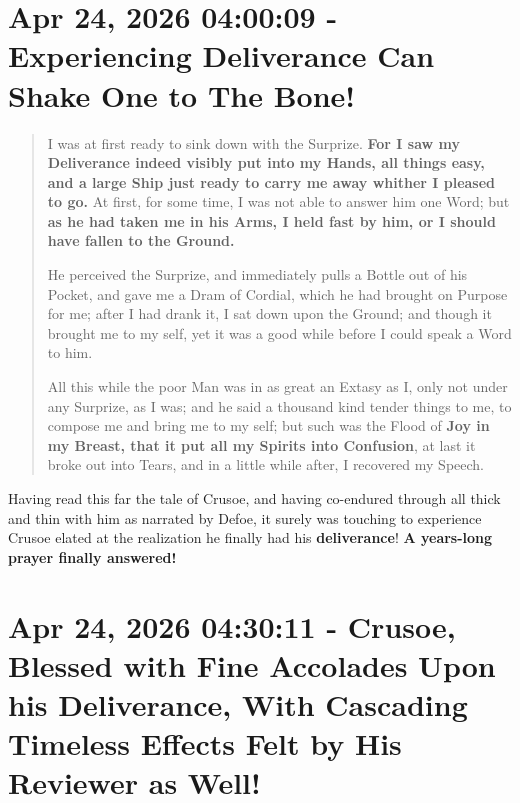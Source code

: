 \documentclass[a4paper]{article}
\begin{document}
\section{Apr 24, 2026 04:00:09 - Experiencing Deliverance Can Shake One to The Bone!}
\label{SEC65}


\noindent
\begin{minipage}{1\textwidth}
\vspace{1em}
\begin{quotation}
{\ttfamily


I was at first ready to sink down with the Surprize. \textbf{For I saw my Deliverance indeed visibly put into my Hands, all things easy, and a large Ship just ready to carry me away whither I pleased to go.} At first, for some time, I was not able to answer him one Word; but \textbf{as he had taken me in his Arms, I held fast by him, or I should have fallen to the Ground.}

He perceived the Surprize, and immediately pulls a Bottle out of his Pocket, and gave me a Dram of Cordial, which he had brought on Purpose for me; after I had drank it, I sat down upon the Ground; and though it brought me to my self, yet it was a good while before I could speak a Word to him.

All this while the poor Man was in as great an Extasy as I, only not under any Surprize, as I was; and he said a thousand kind tender things to me, to compose me and bring me to my self; but such was the Flood of \textbf{Joy in my Breast, that it put all my Spirits into Confusion}, at last it broke out into Tears, and in a little while after, I recovered my Speech.


}
\end{quotation}
\vspace{1em}
\end{minipage}




Having read this far the tale of Crusoe, and having co-endured through all thick and thin with him as narrated by Defoe, it surely was touching to experience Crusoe elated at the realization he finally had his \textbf{deliverance}! \textbf{A years-long prayer finally answered!}





\section{Apr 24, 2026 04:30:11 - Crusoe, Blessed with Fine Accolades Upon his Deliverance, With Cascading Timeless Effects Felt by His Reviewer as Well!}
\label{SEC66}
\end{document}
